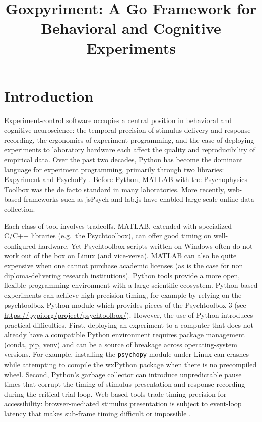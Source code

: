 \documentclass[man,a4paper]{apa7}
\title{Goxpyriment: A Go Framework for Behavioral and Cognitive Experiments}
\begin{document}
\maketitle

\section{Introduction}\label{introduction}

Experiment-control software occupies a central position in behavioral
and cognitive neuroscience: the temporal precision of stimulus
delivery and response recording, the ergonomics of experiment
programming, and the ease of deploying experiments to laboratory
hardware each affect the quality and reproducibility of empirical
data. Over the past two decades, Python has become the dominant
language for experiment programming, primarily through two libraries:
Expyriment \parencite{krause2014} and
PsychoPy \parencite{peirce2019}. Before Python, MATLAB with the
Psychophysics Toolbox \parencite{brainard1997, kleiner2007} was the de
facto standard in many laboratories. More recently, web-based
frameworks such as jsPsych \parencite{deleeuw2015, deleeuw2023} and
lab.js \parencite{henninger2022} have enabled large-scale online data
collection.

Each class of tool involves tradeoffs. MATLAB, extended with
specialized C/C++ libraries (e.g.\ the Psychtoolbox), can offer good
timing on well-configured hardware. Yet Psychtoolbox scripts written
on Windows often do not work out of the box on Linux (and
vice-versa). MATLAB can also be quite expensive when one cannot purchase
academic licenses (as is the case for non diploma-delivering research institutions).
Python tools provide a more open, flexible
programming environment with a large scientific ecosystem.
Python-based experiments can achieve high-precision timing, for
example by relying on the psychtoolbox Python module which provides
pieces of the Psychtoolbox-3 (see
\url{https://pypi.org/project/psychtoolbox/}). However, the use of
Python introduces practical difficulties. First, deploying an
experiment to a computer that does not already have a compatible
Python environment requires package management (conda, pip, venv) and
can be a source of breakage across operating-system versions. For
example, installing the \texttt{psychopy} module under Linux can
crashes while attempting to compile the wxPython package when there is
no precompiled wheel. Second, Python's garbage collector can introduce
unpredictable pause times that corrupt the timing of stimulus
presentation and response recording during the critical trial
loop. Web-based tools trade timing precision for accessibility:
browser-mediated stimulus presentation is subject to event-loop
latency that makes sub-frame timing difficult or impossible
\parencite{bridges2020, anwylirvine2021}.
\end{document}

